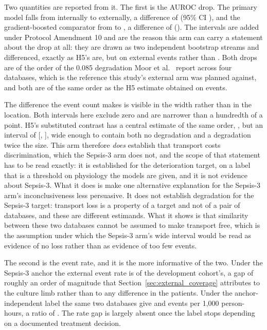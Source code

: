 Two quantities are reported from it. The first is the AUROC drop. The primary
model falls from \pcAltAurocFullPrimaryD{} internally to
\pcExtAltAurocPrimary{} externally, a difference of
\pcExtAltDropPrimary{} (95\% CI \pcExtAltDropCiPrimary), and the
gradient-boosted comparator from
\pcAltAurocFullGbtD{} to \pcExtAltAurocGbt, a difference of
\pcExtAltDropGbt{} (\pcExtAltDropCiGbt). The intervals are added under
Protocol Amendment 10 and are the reason this arm can carry a statement about
the drop at all: they are drawn as two independent bootstrap streams and
differenced, exactly as H5's are, but on \pcExtAltNEvents{} external events
rather than \pcExtNEventsB. Both drops are of the order of the 0.085
degradation Moor et al.\ \cite{moor2023review} report across four databases,
which is the reference this study's external arm was planned against, and both
are of the same order as the H5 estimate obtained on \pcExtNEventsB{} events.

The difference the event count makes is visible in the width rather than in the
location. Both intervals here exclude zero and are narrower than a hundredth of
a point. H5's substituted contrast has a central estimate of the same order,
\pcHFiveEst, but an interval of [\pcHFiveCiLo, \pcHFiveCiHi], wide enough to
contain both no degradation and a degradation twice the size. This arm
therefore \emph{does} establish that transport costs discrimination, which the
Sepsis-3 arm does not, and the scope of that statement has to be read exactly:
it is established for the deterioration target, on a label that is a threshold
on physiology the models are given, and it is not evidence about Sepsis-3.
What it does is make one alternative explanation for the Sepsis-3 arm's
inconclusiveness less persuasive. It does not establish degradation for the
Sepsis-3 target: transport loss is a property of a target and not of a pair of
databases, and these are different estimands. What it shows is that similarity
between these two databases cannot be assumed to make transport free, which is
the assumption under which the Sepsis-3 arm's wide interval would be read as
evidence of no loss rather than as evidence of too few events.

The second is the event rate, and it is the more informative of the two. Under
the Sepsis-3 anchor the external event rate is \pcExtRateRatioB{} of the
development cohort's, a gap of roughly an order of magnitude that
Section~\ref{sec:external_coverage} attributes to the culture limb rather than
to any difference in the patients. Under the anchor-independent label the
same two databases give \pcExtAltRateMimic{} and \pcExtAltRateEicu{} events per
1{,}000 person-hours, a ratio of \pcExtAltRateRatio. The rate gap is largely
absent once the label stops depending on a documented treatment decision.

